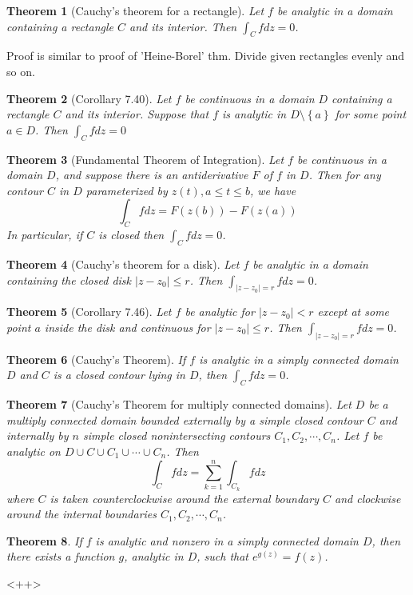 \documentclass{oblivoir}
\newtheorem{theorem}{Theorem}
\begin{document}
\begin{theorem}[Cauchy's theorem for a rectangle]
	Let $f$ be analytic in a domain containing a rectangle $C$ and its interior. Then $\int_C f dz = 0$.
	\label{7.39}
\end{theorem}

Proof is similar to proof of 'Heine-Borel' thm. Divide given rectangles evenly and so on.

\begin{theorem}[Corollary 7.40]
	Let $f$ be continuous in a domain $D$ containing a rectangle $C$ and its interior. Suppose that $f$ is analytic in $D\setminus \left\{ a \right\}$ for some point $a \in D$. Then $\int_C fdz = 0$
	\label{7.40}
\end{theorem}

\begin{theorem}[Fundamental Theorem of Integration]
	Let $f$ be continuous in a domain $D$, and suppose there is an antiderivative $F$ of $f$ in $D$. Then for any contour $C$ in $D$ parameterized by $z(t), a\leq t\leq b$, we have
	\begin{equation}
		\int_C f dz = F(z(b)) - F(z(a))
		\label{<+label+>}
	\end{equation}
In particular, if $C$ is closed then $\int_C fdz = 0$.
	\label{7.41}
\end{theorem}

\begin{theorem}[Cauchy's theorem for a disk]
	Let $f$ be analytic in a domain containing the closed disk $\left | z - z_0  \right | \leq r$. Then $\int_{\left | z - z_0  \right | = r} f dz = 0$.
		\label{7.45}
\end{theorem}

\begin{theorem}[Corollary 7.46]
	Let $f$ be analytic for $\left | z - z_0  \right | < r $ except at some point $a$ inside the disk and continuous for $\left | z - z_0  \right | \leq r$. Then $\int_{\left | z - z_0 \right | =r}f dz = 0$.
	\label{7.46}
\end{theorem}

\begin{theorem}[Cauchy's Theorem]
	If $f$ is analytic in a simply connected domain $D$ and $C$ is a closed contour lying in $D$, then $\int_C f dz = 0$.
	\label{7.47}
\end{theorem}

\begin{theorem}[Cauchy's Theorem for multiply connected domains]
	Let $D$ be a multiply connected domain bounded externally by a simple closed contour $C$ and internally by $n$ simple closed nonintersecting contours $C_1, C_2, \cdots , C_n$. Let $f$ be analytic on $D \cup C\cup C_1 \cup \cdots \cup C_n$. Then 
	\begin{equation}
		\int_C f dz = \sum_{k=1}^n \int_{C_k}f dz
		\label{<+label+>}
	\end{equation}
where $C$ is taken counterclockwise around the external boundary $C$ and clockwise around the internal boundaries $C_1, C_2, \cdots, C_n$.
\label{7.49}
\end{theorem}

\begin{theorem}
	If $f$ is analytic and nonzero in a simply connected domain $D$, then there exists a function $g$, analytic in $D$, such that $e^{g(z)} = f(z)$.
	\label{7.51}
\end{theorem}<++>
\end{document}
